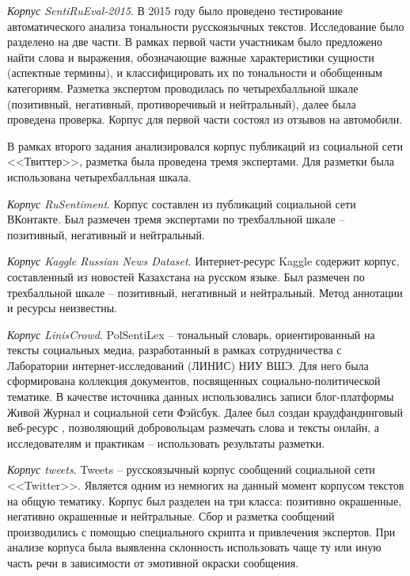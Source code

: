 \textit{Корпус SentiRuEval-2015}. \cite{Loukachevitch2015} В 2015 году было проведено тестирование автоматического анализа тональности русскоязычных текстов. Исследование было разделено на две части. В рамках первой части участникам было предложено найти слова и выражения, обозначающие важные характеристики сущности (аспектные термины), и классифицировать их по тональности и обобщенным категориям. Разметка экспертом проводилась по четырехбалльной шкале (позитивный, негативный, противоречивый и нейтральный), далее была проведена проверка. Корпус для первой части состоял из отзывов на автомобили.

В рамках второго задания анализировался корпус публикаций из социальной сети <<Твиттер>>, разметка была проведена тремя экспертами. Для разметки была использована четырехбалльная шкала. 

\textit{Корпус RuSentiment}. Корпус составлен из публикаций социальной сети ВКонтакте. \cite{Rogers2018} Был размечен тремя экспертами по трехбалльной шкале -- позитивный, негативный и нейтральный. 

\textit{Корпус Kaggle Russian News Dataset}. Интернет-ресурс Kaggle \cite{kaggle} содержит корпус, составленный из новостей Казахстана на русском языке. Был размечен по трехбалльной шкале -- позитивный, негативный и нейтральный. Метод аннотации и ресурсы неизвестны. 

\textit{Корпус LinisCrowd}. PolSentiLex \cite{Koltsova2016} -- тональный словарь, ориентированный на тексты социальных медиа, разработанный в рамках сотрудничества с Лаборатории интернет-исследований (ЛИНИС) НИУ ВШЭ. Для него была сформирована коллекция документов, посвященных социально-политической тематике. В  качестве источника данных использовались записи блог-платформы Живой Журнал и социальной сети Фэйсбук. Далее был создан краудфандинговый веб-ресурс \cite{linis}, позволяющий добровольцам размечать слова и тексты онлайн, а исследователям и практикам – использовать результаты разметки. 

\textit{Корпус tweets}. Tweets \cite{Рубцова2012} -- русскоязычный корпус сообщений социальной сети <<Twitter>>. Является одним из немногих на данный момент корпусом текстов на общую тематику. Корпус был разделен на три класса: позитивно окрашенные, негативно окрашенные и нейтральные. Сбор и разметка сообщений производились с помощью специального скрипта и привлечения экспертов. 
При анализе корпуса была выявленна склонность использовать чаще ту или иную часть речи в зависимости от эмотивной окраски сообщения. 

